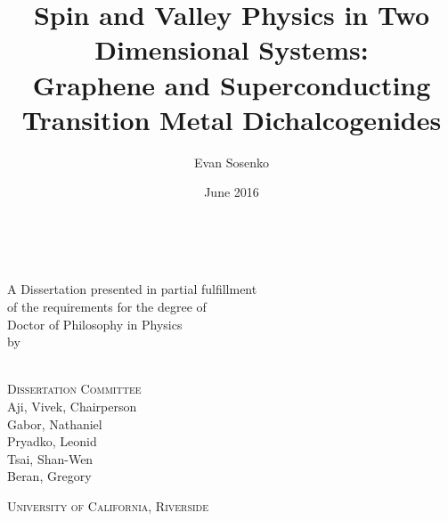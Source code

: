 \title{Spin and Valley Physics in Two Dimensional Systems: \\%
  Graphene and Superconducting Transition Metal Dichalcogenides}
\author{Evan Sosenko}
\date{June 2016}

\newcommand{\thedegree}{Doctor of Philosophy}
\newcommand{\thefield}{Physics}
\newcommand{\theuniversity}{University of California, Riverside}
\newcommand{\thechair}{Aji, Vivek}
\newcommand{\thecommittee}{%
  Gabor, Nathaniel \\
  Pryadko, Leonid \\
  Tsai, Shan-Wen \\
  Beran, Gregory
}

\clearpage
\thispagestyle{empty}
\centering
\vspace*{-\toptafiddle}

\textsc{\thetitle} \\

\vfill

A Dissertation presented in partial fulfillment \\
of the requirements for the degree of \\
\thedegree{} in \thefield{} \\
by \\
\theauthor{} \\
\thedate{}

\vfill

\textsc{Dissertation Committee} \\
\thechair{}, Chairperson \\
\thecommittee{}

\vfill

\textsc{\theuniversity}

\enlargethispage{\bottafiddle}
\clearpage
